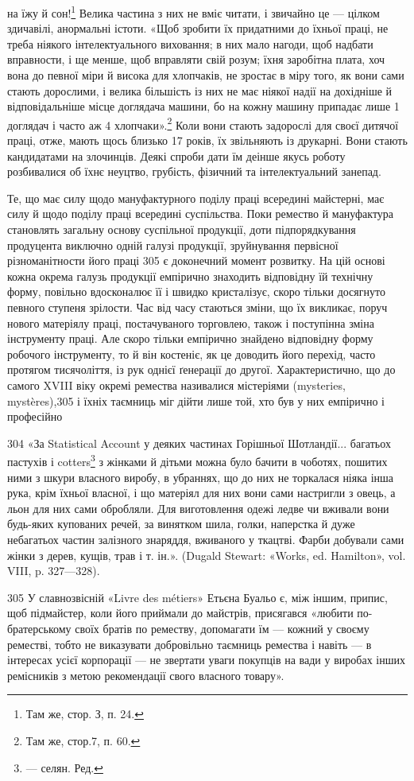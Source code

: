 \parcont{}  %
на їжу й сон!\footnote{
Там же, стор. З, п. 24.
} Велика частина з них не вміє читати, і звичайно
це — цілком здичавілі, анормальні істоти. «Щоб зробити їх
придатними до їхньої праці, не треба ніякого інтелектуального
виховання; в них мало нагоди, щоб надбати вправности, і ще
менше, щоб вправляти свій розум; їхня заробітна плата, хоч вона
до певної міри й висока для хлопчаків, не зростає в міру того, як
вони сами стають дорослими, і велика більшість із них не має
ніякої надії на дохідніше й відповідальніше місце доглядача
машини, бо на кожну машину припадає лише 1 доглядач і часто
аж 4 хлопчаки».\footnote{
Там же, стор.7, п. 60.
} Коли вони стають задорослі для своєї
дитячої праці, отже, мають щось близько 17 років, їх звільняють
із друкарні. Вони стають кандидатами на злочинців. Деякі спроби
дати їм деінше якусь роботу розбивалися об їхнє неуцтво, грубість,
фізичний та інтелектуальний занепад.

Те, що має силу щодо мануфактурного поділу праці всередині
майстерні, має силу й щодо поділу праці всередині суспільства.
Поки ремество й мануфактура становлять загальну основу суспільної
продукції, доти підпорядкування продуцента виключно
одній галузі продукції, зруйнування первісної різноманітности
його праці 305 є доконечний момент розвитку. На цій основі
кожна окрема галузь продукції емпірично знаходить відповідну
їй технічну форму, повільно вдосконалює її і швидко кристалізує,
скоро тільки досягнуто певного ступеня зрілости. Час від
часу стаються зміни, що їх викликає, поруч нового матеріялу
праці, постачуваного торговлею, також і поступінна зміна інструменту
праці. Але скоро тільки емпірично знайдено відповідну
форму робочого інструменту, то й він костеніє, як це доводить
його перехід, часто протягом тисячоліття, із рук однієї ґенерації
до другої. Характеристично, що до самого XVIII віку окремі
ремества називалися містеріями (mysteries, mystères),305 і їхніх
таємниць міг дійти лише той, хто був у них емпірично і професійно

304 «За Statistical Account у деяких частинах Горішньої Шотландії...
багатьох пастухів і cotters\footnote*{
— селян. Ред.
} з жінками й дітьми можна було бачити
в чоботях, пошитих ними з шкури власного виробу, в убраннях, що до
них не торкалася ніяка інша рука, крім їхньої власної, і що матеріял
для них вони сами настригли з овець, а льон для них сами обробляли.
Для виготовлення одежі ледве чи вживали вони будь-яких купованих
речей, за винятком шила, голки, наперстка й дуже небагатьох частин
залізного знаряддя, вживаного у ткацтві. Фарби добували сами жінки з
дерев, кущів, трав і т. ін.». (Dugald Stewart: «Works, ed. Hamilton»,
vol. VIII, p. 327—328).

305    У славнозвісній «Livre des métiers» Етьєна Буальо є, між іншим,
припис, щоб підмайстер, коли його приймали до майстрів, присягався
«любити по-братерському своїх братів по реместву, допомагати їм —
кожний у своєму реместві, тобто не виказувати добровільно таємниць
ремества і навіть — в інтересах усієї корпорації — не звертати уваги
покупців на вади у виробах інших ремісників з метою рекомендації свого
власного товару».
\parbreak{}  %
